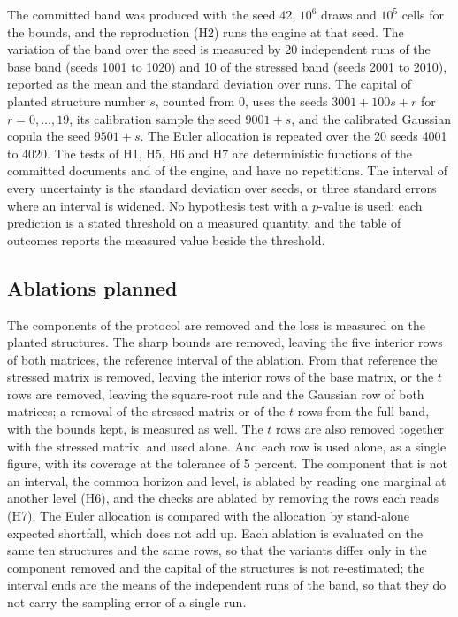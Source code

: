 The committed band was produced with the seed 42, $10^6$ draws and $10^5$ cells for the bounds, and the reproduction (H2) runs the
engine at that seed. The variation of the band over the seed is measured by 20 independent runs of the base band (seeds 1001 to
1020) and 10 of the stressed band (seeds 2001 to 2010), reported as the mean and the standard deviation over runs. The capital of
planted structure number $s$, counted from 0, uses the seeds $3001+100s+r$ for $r=0,\dots,19$, its calibration sample the seed
$9001+s$, and the calibrated Gaussian copula the seed $9501+s$. The Euler allocation is repeated over the 20 seeds 4001 to 4020. The
tests of H1, H5, H6 and H7 are deterministic functions of the committed documents and of the engine, and have no repetitions. The
interval of every uncertainty is the standard deviation over seeds, or three standard errors where an interval is widened. No
hypothesis test with a $p$-value is used: each prediction is a stated threshold on a measured quantity, and the table of outcomes
reports the measured value beside the threshold.

\subsection{Ablations planned}
\label{sec:design-ablation}

The components of the protocol are removed and the loss is measured on the planted structures. The sharp bounds are removed, leaving the
five interior rows of both matrices, the reference interval of the ablation. From that reference the stressed matrix is removed,
leaving the interior rows of the base matrix, or the $t$ rows are removed, leaving the square-root rule and the Gaussian row of both
matrices; a removal of the stressed matrix or of the $t$ rows from the full band, with the bounds kept, is measured as well. The $t$ rows
are also removed together with the stressed matrix, and used alone. And each row is used alone, as a single figure,
with its coverage at the tolerance of 5 percent. The component that is not an interval, the common horizon and level, is ablated
by reading one marginal at another level (H6), and the checks are ablated by removing the rows each reads (H7). The Euler
allocation is compared with the allocation by stand-alone expected shortfall, which does not add up. Each ablation is evaluated on
the same ten structures and the same rows, so that the variants differ only in the component removed and the capital of the
structures is not re-estimated; the interval ends are the means of the independent runs of the band, so that they do not carry
the sampling error of a single run.
